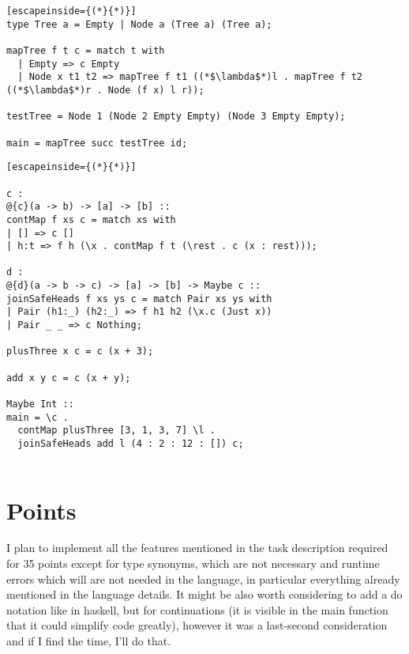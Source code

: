 \documentclass{article}
\begin{document}
	\begin{lstlisting}[escapeinside={(*}{*)}]
type Tree a = Empty | Node a (Tree a) (Tree a);

mapTree f t c = match t with
  | Empty => c Empty
  | Node x t1 t2 => mapTree f t1 ((*$\lambda$*)l . mapTree f t2 ((*$\lambda$*)r . Node (f x) l r));

testTree = Node 1 (Node 2 Empty Empty) (Node 3 Empty Empty);

main = mapTree succ testTree id;
	\end{lstlisting}
	\begin{lstlisting}[escapeinside={(*}{*)}]

c :
@{c}(a -> b) -> [a] -> [b] ::
contMap f xs c = match xs with
| [] => c []
| h:t => f h (\x . contMap f t (\rest . c (x : rest)));

d :
@{d}(a -> b -> c) -> [a] -> [b] -> Maybe c ::
joinSafeHeads f xs ys c = match Pair xs ys with
| Pair (h1:_) (h2:_) => f h1 h2 (\x.c (Just x))
| Pair _ _ => c Nothing;

plusThree x c = c (x + 3);

add x y c = c (x + y);

Maybe Int ::
main = \c .
  contMap plusThree [3, 1, 3, 7] \l .
  joinSafeHeads add l (4 : 2 : 12 : []) c;


	\end{lstlisting}
	\section{Points}
	I plan to implement all the features mentioned in the task description required for 35 points except
	for type synonyms, which are not necessary and runtime errors which will are not needed in the language, in particular everything already mentioned in the language details. It might be also worth considering to add a do notation like in haskell, but for continuations (it is visible in the main function that it could simplify code greatly), however it was a last-second consideration and if I find the time, I'll do that.
\end{document}
